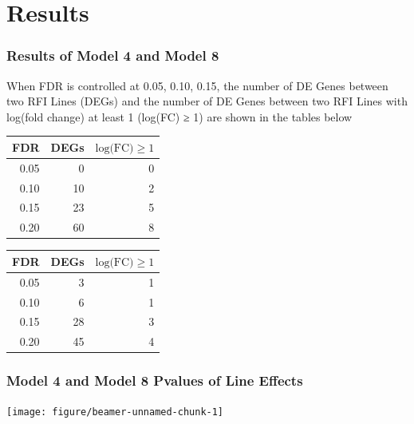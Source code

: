 \documentclass[handout,xcolor=pdftex,dvipsnames,table]{beamer}\usepackage[]{graphicx}\usepackage[]{color}
\newenvironment{knitrout}{}{} %
\begin{document}
\section{Results}
\begin{frame}[fragile]
\frametitle{Results of Model 4 and Model 8}
When FDR is controlled at 0.05, 0.10, 0.15, the number of DE Genes
between two RFI Lines (DEGs) and the number of DE Genes between
two RFI Lines with log(fold change) at least 1 (log(FC) ≥ 1) are
shown in the tables below









\begin{table}[htb]
\begin{minipage}{.45\textwidth}
\centering
\begin{tabular}{rrr}
  \toprule
FDR & DEGs & $\mbox{log(FC)}\geq 1$ \\ 
  \midrule
0.05 &   0 &   0 \\ 
  0.10 &  10 &   2 \\ 
  0.15 &  23 &   5 \\ 
  0.20 &  60 &   8 \\ 
   \bottomrule
\end{tabular}


\end{minipage}
\begin{minipage}{.45\textwidth}
\centering
\begin{tabular}{rrr}
  \toprule
FDR & DEGs & $\mbox{log(FC)}\geq 1$ \\ 
  \midrule
0.05 &   3 &   1 \\ 
  0.10 &   6 &   1 \\ 
  0.15 &  28 &   3 \\ 
  0.20 &  45 &   4 \\ 
   \bottomrule
\end{tabular}


\end{minipage}
\end{table}


\end{frame}
\begin{frame}[fragile]
\frametitle{Model 4 and Model 8 Pvalues of Line Effects }
\begin{knitrout}\footnotesize
{}\color{fgcolor}

{\centering \texttt{[image: figure/beamer-unnamed-chunk-1]} 

}



\end{knitrout}


\end{frame}
\end{document}
